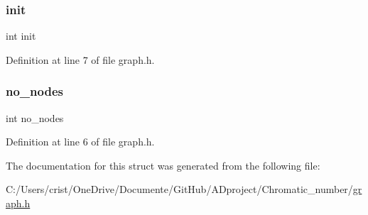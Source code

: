 \subsubsection{\texorpdfstring{init}{init}}
{\footnotesize\ttfamily int init}



Definition at line 7 of file graph.\+h.

\mbox{\label{structa__graph_aedec94f21ea36fb82d6fbf7847428504}} 
\subsubsection{\texorpdfstring{no\+\_\+nodes}{no\_nodes}}
{\footnotesize\ttfamily int no\+\_\+nodes}



Definition at line 6 of file graph.\+h.



The documentation for this struct was generated from the following file\+:\begin{DoxyCompactItemize}
\item 
C\+:/\+Users/crist/\+One\+Drive/\+Documente/\+Git\+Hub/\+A\+Dproject/\+Chromatic\+\_\+number/\hyperlink{graph_8h}{graph.\+h}\end{DoxyCompactItemize}
